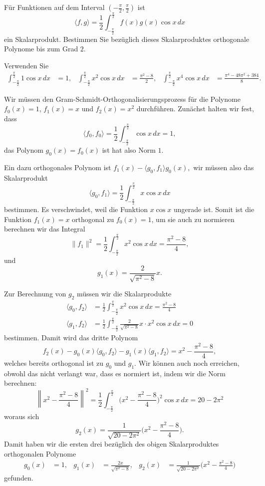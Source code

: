 Für Funktionen auf dem Interval $(-\frac{\pi}2,\frac{\pi}2)$ ist
\[
\langle f,g\rangle
=
\frac12\int_{-\frac{\pi}2}^{\frac{\pi}2} f(x)g(x)\cos x\,dx
\]
ein Skalarprodukt.
Bestimmen Sie bezüglich dieses Skalarproduktes orthogonale Polynome
bis zum Grad $2$.

\begin{hinweis}
Verwenden Sie
\begin{align*}
\int_{-\frac{\pi}2}^{\frac{\pi}2} 1\cos x\,dx
&=
1,
&
\int_{-\frac{\pi}2}^{\frac{\pi}2} x^2\cos x\,dx
&=
\frac{\pi^2-8}{2},
&
\int_{-\frac{\pi}2}^{\frac{\pi}2} x^4\cos x\,dx
&=
\frac{\pi^4-48\pi^2+384}{8}.
\end{align*}
\end{hinweis}

\begin{loesung}
Wir müssen den Gram-Schmidt-Orthogonalisierungsprozess für die
Polynome $f_0(x)=1$, $f_1(x)=x$ und $f_2(x)=x^2$ durchführen.
Zunächst halten wir fest, dass
\[
\langle f_0,f_0\rangle
=
\frac12
\int_{-\frac{\pi}2}^{\frac{\pi}2} \cos x\,dx
=
1,
\]
das Polynom $g_0(x)=f_0(x)$ ist hat also Norm $1$.

Ein dazu orthogonales Polynom ist
\(
f_1(x) - \langle g_0,f_1\rangle g_0(x),
\)
wir müssen also das Skalarprodukt
\[
\langle g_0,f_1\rangle
=
\frac{1}{2}
\int_{-\frac{\pi}2}^{\frac{\pi}2}
x\cos x\,dx
\]
bestimmen.
Es verschwindet, weil die Funktion $x\cos x$ ungerade ist.
Somit ist die Funktion $f_1(x)=x$ orthogonal zu $f_0(x)=1$, um sie auch zu
normieren berechnen wir das Integral
\[
\| f_1\|^2
=
\frac12\int_{-\frac{\pi}2}^{\frac{\pi}2} x^2\cos x\,dx
=
\frac{\pi^2-8}{4},
\]
und 
\[
g_1(x)
=
\frac{2}{\sqrt{\pi^2-8}} x.
\]

Zur Berechnung von $g_2$ müssen wir die Skalarprodukte
\begin{align*}
\langle g_0,f_2\rangle
&=
\frac{1}{2}
\int_{-\frac{\pi}2}^{\frac{\pi}2}
x^2
\cos x
\,dx
=
\frac{\pi^2-8}{4}
\\
\langle g_1,f_2\rangle
&=
\frac{1}{2}
\int_{-\frac{\pi}2}^{\frac{\pi}2}
\frac{2}{\sqrt{\pi^2-8}}
x
\cdot x^2
\cos x
\,dx
=
0
\end{align*}
bestimmen.
Damit wird das dritte Polynom
\[
f_2(x)
- g_0(x)\langle g_0,f_2\rangle
- g_1(x)\langle g_1,f_2\rangle
=
x^2 - \frac{\pi^2-8}{4},
\]
welches bereits orthogonal ist zu $g_0$ und $g_1$.
Wir können auch noch erreichen, obwohl das nicht verlangt war,
dass es normiert ist, indem wir die Norm berechnen:
\[
\left\| x^2-\frac{\pi^2-8}{4} \right\|^2
=
\frac12
\int_{-\frac{\pi}2}^{\frac{\pi}2}
\biggl(x^2-\frac{\pi^2-8}{4}\biggr)^2
\cos x\,dx
=
20-2\pi^2
\]
woraus sich
\[
g_2(x)
=
\frac{1}{\sqrt{20-2\pi^2}}
\biggl(
x^2 - \frac{\pi^2-8}{4}
\biggr).
\]
Damit haben wir die ersten drei bezüglich des obigen Skalarproduktes
orthogonalen Polynome
\begin{align*}
g_0(x)&=1,
&
g_1(x)&=\frac{2x}{\sqrt{\pi^2-8}},
&
g_2(x)&=\frac{1}{\sqrt{20-2\pi^2}}\biggl(x^2-\frac{\pi^2-8}{4}\biggr)
\end{align*}
gefunden.
\end{loesung}
